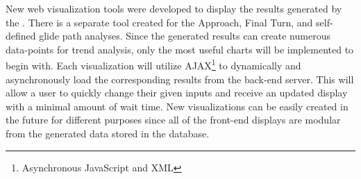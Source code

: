     New web visualization tools were developed to display the results generated by the \toolname.  There is a separate tool created for the Approach, Final Turn, and self-defined glide path analyses.  Since the generated results can create numerous data-points for trend analysis, only the most useful charts will be implemented to begin with.  Each visualization will utilize AJAX\footnote{Asynchronous JavaScript and XML} to dynamically and asynchronously load the corresponding results from the back-end server.  This will allow a user to quickly change their given inputs and receive an updated display with a minimal amount of wait time.  New visualizations can be easily created in the future for different purposes since all of the front-end displays are modular from the generated data stored in the database.

